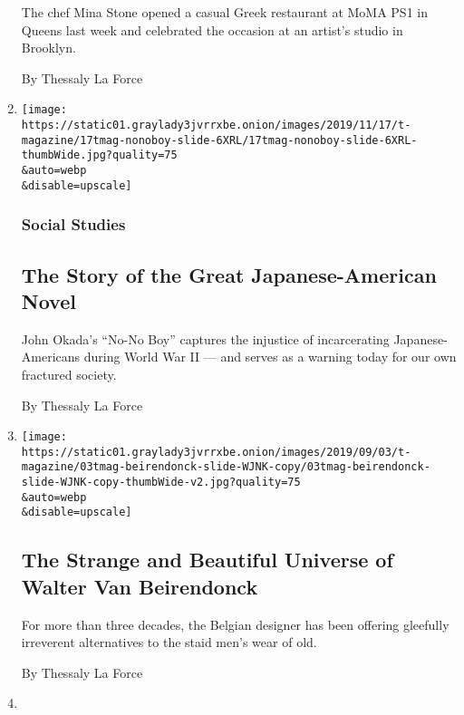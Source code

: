 \begin{enumerate}
  The chef Mina Stone opened a casual Greek restaurant at MoMA PS1 in
  Queens last week and celebrated the occasion at an artist's studio in
  Brooklyn.

  By Thessaly La Force
\item
  \href{/2019/11/04/t-magazine/japanese-american-novel.html}{}

  \texttt{[image: https://static01.graylady3jvrrxbe.onion/images/2019/11/17/t-magazine/17tmag-nonoboy-slide-6XRL/17tmag-nonoboy-slide-6XRL-thumbWide.jpg?quality=75\\\&auto=webp\\\&disable=upscale]}

  \hypertarget{social-studies}{%
  \subsubsection{Social Studies}\label{social-studies}}

  \hypertarget{the-story-of-the-great-japanese-american-novel}{%
  \subsection{The Story of the Great Japanese-American
  Novel}\label{the-story-of-the-great-japanese-american-novel}}

  John Okada's ``No-No Boy'' captures the injustice of incarcerating
  Japanese-Americans during World War II --- and serves as a warning
  today for our own fractured society.

  By Thessaly La Force
\item
  \href{/2019/09/03/t-magazine/walter-van-beirendonck.html}{}

  \texttt{[image: https://static01.graylady3jvrrxbe.onion/images/2019/09/03/t-magazine/03tmag-beirendonck-slide-WJNK-copy/03tmag-beirendonck-slide-WJNK-copy-thumbWide-v2.jpg?quality=75\\\&auto=webp\\\&disable=upscale]}

  \hypertarget{the-strange-and-beautiful-universe-of-walter-van-beirendonck}{%
  \subsection{The Strange and Beautiful Universe of Walter Van
  Beirendonck}\label{the-strange-and-beautiful-universe-of-walter-van-beirendonck}}

  For more than three decades, the Belgian designer has been offering
  gleefully irreverent alternatives to the staid men's wear of old.

  By Thessaly La Force
\item
  \href{/2019/08/26/t-magazine/asian-american-comedians.html}{}


\end{enumerate}

